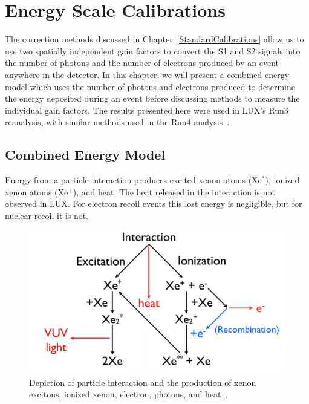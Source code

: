 
\section{Energy Scale Calibrations} \label{CombinedEnergyModel}

The correction methods discussed in Chapter~\ref{StandardCalibrations} allow us to use two spatially independent gain factors to convert the S1 and S2 signals into the number of photons and the number of electrons produced by an event anywhere in the detector. In this chapter, we will present a combined energy model which uses the number of photons and electrons produced to determine the energy deposited during an event before discussing methods to measure the individual gain factors.  The results presented here were used in LUX's Run3 reanalysis, with similar methods used in the Run4 analysis~\cite{Akerib:2015rjg}.


\subsection{Combined Energy Model} \label{RecombSec} 


Energy from a particle interaction produces excited xenon atoms (Xe$^*$), ionized xenon atoms (Xe$^+$), and heat.  The heat released in the interaction is not observed in LUX.  For electron recoil events this lost energy is negligible, but for nuclear recoil it is not.

\begin{figure}[h]\centering
\includegraphics[scale=0.3]{InteractionPhysics.png}
\caption{Depiction of particle interaction and the production of xenon excitons, ionized xenon, electron, photons, and heat~\cite{Phelps}.}
\label{fig:InteractionPhysics}
\end{figure}

